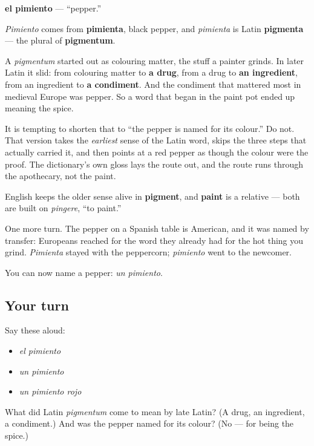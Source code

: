 \begin{cousinweb}
\textbf{el pimiento} — \textquotedblleft{}pepper.\textquotedblright{}

\emph{Pimiento} comes from \textbf{pimienta}, black pepper, and \emph{pimienta} is Latin \textbf{pigmenta} — the plural of \textbf{pigmentum}.

A \emph{pigmentum} started out as colouring matter, the stuff a painter grinds. In later Latin it slid: from colouring matter to \textbf{a drug}, from a drug to \textbf{an ingredient}, from an ingredient to \textbf{a condiment}. And the condiment that mattered most in medieval Europe was pepper. So a word that began in the paint pot ended up meaning the spice.

It is tempting to shorten that to \textquotedblleft{}the pepper is named for its colour.\textquotedblright{} Do not. That version takes the \emph{earliest} sense of the Latin word, skips the three steps that actually carried it, and then points at a red pepper as though the colour were the proof. The dictionary's own gloss lays the route out, and the route runs through the apothecary, not the paint.

English keeps the older sense alive in \textbf{pigment}, and \textbf{paint} is a relative — both are built on \emph{pingere}, \textquotedblleft{}to paint.\textquotedblright{}

One more turn. The pepper on a Spanish table is American, and it was named by transfer: Europeans reached for the word they already had for the hot thing you grind. \emph{Pimienta} stayed with the peppercorn; \emph{pimiento} went to the newcomer.
\end{cousinweb}

\begin{grammarlens}[title={What you've built}]
You can now name a pepper: \emph{un pimiento}.
\end{grammarlens}

\subsection*{Your turn}
Say these aloud:

\begin{itemize}
\raggedright
  \item \emph{el pimiento}
  \item \emph{un pimiento}
  \item \emph{un pimiento rojo}
\end{itemize}

\begin{tcolorbox}[breakable,colback=teal!4,colframe=teal!35!black,title={Before you move on}]
What did Latin \emph{pigmentum} come to mean by late Latin? (A drug, an ingredient, a condiment.) And was the pepper named for its colour? (No — for being the spice.)
\end{tcolorbox}
